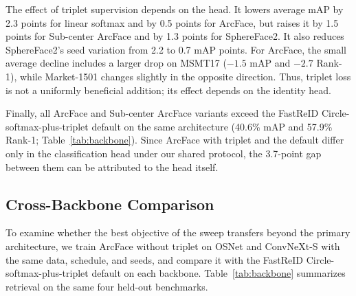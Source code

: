 \documentclass{llncs}
\begin{document}
The effect of triplet supervision depends on the head. It lowers average mAP by 2.3 points for linear softmax and by 0.5 points for ArcFace, but raises it by 1.5 points for Sub-center ArcFace and by 1.3 points for SphereFace2. It also reduces SphereFace2's seed variation from 2.2 to 0.7 mAP points. For ArcFace, the small average decline includes a larger drop on MSMT17 ($-1.5$ mAP and $-2.7$ Rank-1), while Market-1501 changes slightly in the opposite direction. Thus, triplet loss is not a uniformly beneficial addition; its effect depends on the identity head.

Finally, all ArcFace and Sub-center ArcFace variants exceed the FastReID Circle-softmax-plus-triplet default on the same architecture (40.6\% mAP and 57.9\% Rank-1; Table~\ref{tab:backbone}). Since ArcFace with triplet and the default differ only in the classification head under our shared protocol, the 3.7-point gap between them can be attributed to the head itself.

\subsection{Cross-Backbone Comparison}
\label{sec:backbone-results}

To examine whether the best objective of the sweep transfers beyond the primary architecture, we train ArcFace without triplet on OSNet and ConvNeXt-S with the same data, schedule, and seeds, and compare it with the FastReID Circle-softmax-plus-triplet default on each backbone. Table~\ref{tab:backbone} summarizes retrieval on the same four held-out benchmarks.
\end{document}
